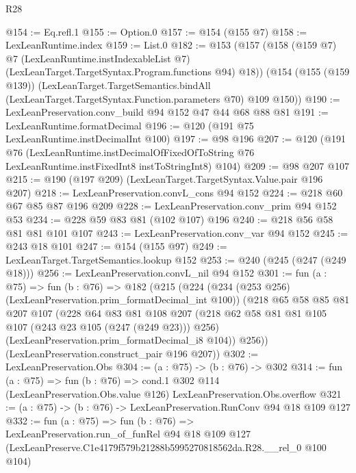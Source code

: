 \begin{lexlean}{R28}
\begin{coremodule}
@154 := Eq.refl.{1}
@155 := Option.{0}
@157 := @154 (@155 @7)
@158 := LexLeanRuntime.index
@159 := List.{0}
@182 := @153
    (@157
      (@158
        (@159 @7)
        @7
        (LexLeanRuntime.instIndexableList @7)
        (LexLeanTarget.TargetSyntax.Program.functions @94)
        @18))
    (@154
      (@155 (@159 @139))
      (LexLeanTarget.TargetSemantics.bindAll
        (LexLeanTarget.TargetSyntax.Function.parameters @70)
        @109
        @150))
@190 := LexLeanPreservation.conv_build @94 @152 @47 @44 @68 @88 @81
@191 := LexLeanRuntime.formatDecimal
@196 := @120 (@191 @75 LexLeanRuntime.instDecimalInt @100)
@197 := @98 @196
@207 := @120
    (@191
      @76
      (LexLeanRuntime.instDecimalOfFixedOfToString
        @76
        LexLeanRuntime.instFixedInt8
        instToStringInt8)
      @104)
@209 := @98 @207 @107
@215 := @190 (@197 @209) (LexLeanTarget.TargetSyntax.Value.pair @196 @207)
@218 := LexLeanPreservation.convL_cons @94 @152
@224 := @218 @60 @67 @85 @87 @196 @209
@228 := LexLeanPreservation.conv_prim @94 @152 @53
@234 := @228 @59 @83 @81 (@102 @107) @196
@240 := @218 @56 @58 @81 @81 @101 @107
@243 := LexLeanPreservation.conv_var @94 @152
@245 := @243 @18 @101
@247 := @154 (@155 @97)
@249 := LexLeanTarget.TargetSemantics.lookup @152
@253 := @240 (@245 (@247 (@249 @18)))
@256 := LexLeanPreservation.convL_nil @94 @152
@301 := fun (a : @75) =>
  fun (b : @76) =>
  @182
    (@215
      (@224
        (@234 (@253 @256) (LexLeanPreservation.prim_formatDecimal_int @100))
        (@218
          @65
          @58
          @85
          @81
          @207
          @107
          (@228
            @64
            @83
            @81
            @108
            @207
            (@218 @62 @58 @81 @81 @105 @107 (@243 @23 @105 (@247 (@249 @23))) @256)
            (LexLeanPreservation.prim_formatDecimal_i8 @104))
          @256))
      (LexLeanPreservation.construct_pair @196 @207))
@302 := LexLeanPreservation.Obs
@304 := (a : @75) -> (b : @76) -> @302
@314 := fun (a : @75) =>
  fun (b : @76) =>
  cond.{1} @302 @114 (LexLeanPreservation.Obs.value @126) LexLeanPreservation.Obs.overflow
@321 := (a : @75) -> (b : @76) -> LexLeanPreservation.RunConv @94 @18 @109 @127
@332 := fun (a : @75) =>
  fun (b : @76) =>
  LexLeanPreservation.run_of_funRel
    @94
    @18
    @109
    @127
    (LexLeanPreserve.C1e4179f579b21288b5995270818562da.R28.__rel_0 @100 @104)
\end{coremodule}
\end{lexlean}
